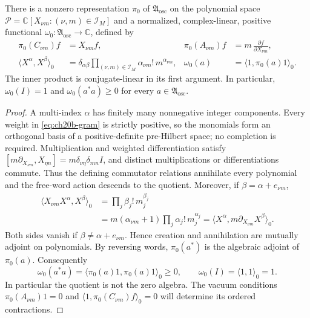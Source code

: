\begin{proposition}
\label{prop:ch20b-vacuum}
There is a nonzero representation \(\pi_0\) of
\(\mathfrak A_{\mathrm{osc}}\) on the polynomial space
\(\mathcal P=\mathbb C[X_{\nu m}:(\nu,m)\in\mathcal I_M]\) and a
normalized, complex-linear, positive functional
\(\omega_0:\mathfrak A_{\mathrm{osc}}\to\mathbb C\), defined by
\begin{align}
 \pi_0(C_{\nu m})f&=X_{\nu m}f,
 &\pi_0(A_{\nu m})f&=m\,\frac{\partial f}{\partial X_{\nu m}},
 \label{eq:ch20b-polynomial-action}\\
 \langle X^\alpha,X^\beta\rangle_0
 &=\delta_{\alpha\beta}\prod_{(\nu,m)\in\mathcal I_M}
       \alpha_{\nu m}!\,m^{\alpha_{\nu m}},
 &\omega_0(a)&=\langle1,\pi_0(a)1\rangle_0.
 \label{eq:ch20b-gram}
\end{align}
The inner product is conjugate-linear in its first argument.  In
particular,
\(\omega_0(I)=1\) and \(\omega_0(a^*a)\geq0\) for every
\(a\in\mathfrak A_{\mathrm{osc}}\).
\end{proposition}
\begin{proof}
A multi-index \(\alpha\) has finitely many nonnegative integer
components.  Every weight in \eqref{eq:ch20b-gram} is strictly positive,
so the monomials form an orthogonal basis of a positive-definite
pre-Hilbert space; no completion is required.  Multiplication and
weighted differentiation satisfy
\([m\partial_{X_{\nu m}},X_{\eta n}]
 =m\delta_{\nu\eta}\delta_{mn}I\), and distinct multiplications or
differentiations commute.  Thus the defining commutator relations
annihilate every polynomial and the free-word action descends to the
quotient.  Moreover, if \(\beta=\alpha+e_{\nu m}\),
\begin{align*}
 \langle X_{\nu m}X^\alpha,X^\beta\rangle_0
 &=\prod_j\beta_j!\,m_j^{\beta_j}\\
 &=m(\alpha_{\nu m}+1)
         \prod_j\alpha_j!\,m_j^{\alpha_j}
 =\langle X^\alpha,m\partial_{X_{\nu m}}X^\beta\rangle_0.
\end{align*}
Both sides vanish if \(\beta\neq\alpha+e_{\nu m}\).  Hence creation
and annihilation are mutually adjoint on polynomials.  By reversing
words, \(\pi_0(a^*)\) is the algebraic adjoint of \(\pi_0(a)\).
Consequently
\[
 \omega_0(a^*a)=\langle\pi_0(a)1,\pi_0(a)1\rangle_0\geq0,
 \qquad\omega_0(I)=\langle1,1\rangle_0=1.
\]
In particular the quotient is not the zero algebra.  The vacuum
conditions \(\pi_0(A_{\nu m})1=0\) and
\(\langle1,\pi_0(C_{\nu m})f\rangle_0=0\) will determine its ordered
contractions.
\end{proof}

